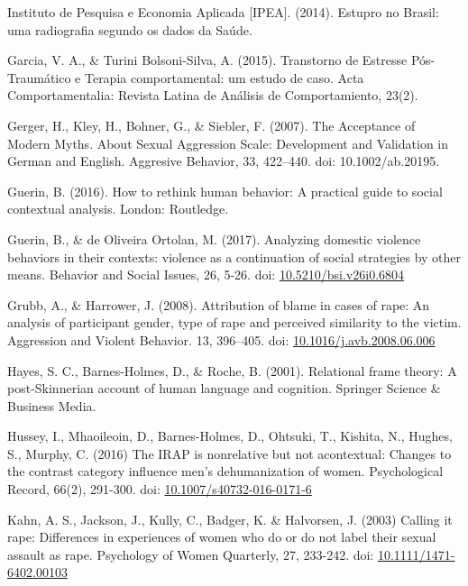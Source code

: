 \hangindent=25pt
\noindent Instituto de Pesquisa e Economia Aplicada [IPEA]. (2014). Estupro no Brasil: uma radiografia segundo os dados da Saúde.

\hangindent=25pt
\noindent Garcia, V. A., \& Turini Bolsoni-Silva, A. (2015). Transtorno de Estresse Pós-Traumático e Terapia comportamental: um estudo de caso. Acta Comportamentalia: Revista Latina de Análisis de Comportamiento, 23(2). 

\hangindent=25pt
\noindent Gerger, H., Kley, H., Bohner, G., \& Siebler, F. (2007). The Acceptance of Modern Myths. About Sexual Aggression Scale: Development and Validation in German and English. Aggresive Behavior, 33, 422–440. doi: 10.1002/ab.20195.

\hangindent=25pt
\noindent Guerin, B. (2016). How to rethink human behavior: A practical guide to social contextual analysis. London: Routledge.

\hangindent=25pt
\noindent Guerin, B., \& de Oliveira Ortolan, M. (2017). Analyzing domestic violence behaviors in their contexts: violence as a continuation of social strategies by other means. Behavior and Social Issues, 26, 5-26. doi: \url{10.5210/bsi.v26i0.6804}

\hangindent=25pt
\noindent Grubb, A., \& Harrower, J. (2008). Attribution of blame in cases of rape: An analysis of participant gender, type of rape and perceived similarity to the victim. Aggression and Violent Behavior. 13, 396–405. doi: \url{10.1016/j.avb.2008.06.006}

\hangindent=25pt
\noindent Hayes, S. C., Barnes-Holmes, D., \& Roche, B. (2001). Relational frame theory: A post-Skinnerian account of human language and cognition. Springer Science \& Business Media. 

\hangindent=25pt
\noindent Hussey, I., Mhaoileoin, D., Barnes-Holmes, D., Ohtsuki, T., Kishita, N., Hughes, S., Murphy, C. (2016) The IRAP is nonrelative but not acontextual: Changes to the contrast category influence men's dehumanization of women. Psychological Record, 66(2), 291-300. doi: \url{10.1007/s40732-016-0171-6}

\hangindent=25pt
\noindent Kahn, A. S., Jackson, J., Kully, C., Badger, K. \& Halvorsen, J. (2003) Calling it rape: Differences in experiences of women who do or do not label their sexual assault as rape. Psychology of Women Quarterly, 27, 233-242. doi: \url{10.1111/1471-6402.00103}


